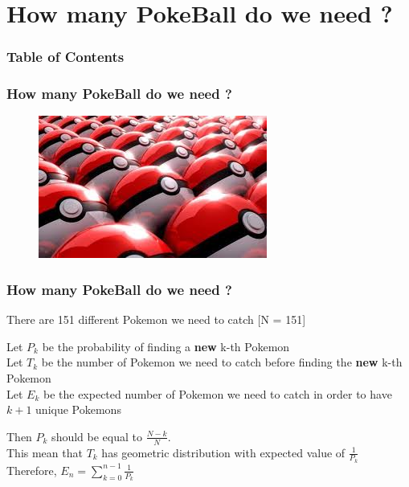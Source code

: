 \documentclass{beamer}
\theoremstyle{plain}
\begin{document}
	\section{How many PokeBall do we need ?}
	\begin{frame}
		\frametitle{Table of Contents}
		\tableofcontents[currentsection]
	\end{frame}
	\begin{frame}
		\frametitle{How many PokeBall do we need ?}
		\begin{figure}
			\includegraphics[scale=.8]{pokeball_pile.jpeg}
		\end{figure}		
		
	\end{frame}
	
	
	\begin{frame}
		\frametitle{How many PokeBall do we need ?}
		
		 There are 151 different Pokemon we need to catch [N = 151] \\ \vspace{10pt}
		
		 Let $P_k$ be the probability of finding a \textbf{new} k-th Pokemon \\
		\onslide<3-> Let $T_k$ be the number of Pokemon we need to catch before finding the \textbf{new} k-th Pokemon \\
		\onslide<4-> Let $E_k$ be the expected number of Pokemon we need to catch in order to have $k+1$ unique Pokemons \\ \vspace{10pt}
			
		 Then $P_k$ should be equal to $\frac{N - k}{N}$. \\ \vspace{5pt}
		\onslide<6-> This mean that $T_k$ has geometric distribution with expected value of $\frac{1}{P_k}$ \\ \vspace{5pt} 
		\onslide<7-> Therefore, $E_n = \sum_{k = 0}^{n - 1}{\frac{1}{P_k}}$ 
		
	\end{frame}
	
\end{document}
